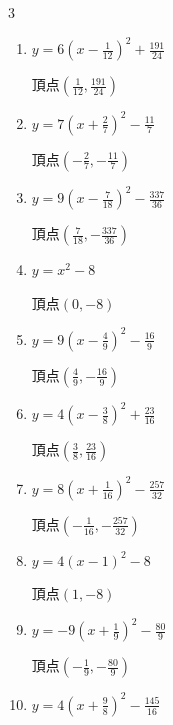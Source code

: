 \begin{multicols}{3}
\begin{enumerate}
        $\displaystyle 頂点\left( -\frac{3}{8} , \frac{7}{16} \right)$

  \item $\displaystyle y=6\left( x-\frac{1}{12}\right)^{2}+\frac{191}{24}$

        $\displaystyle 頂点\left( \frac{1}{12} , \frac{191}{24} \right)$

  \item $\displaystyle y=7\left( x+\frac{2}{7}\right)^{2}-\frac{11}{7}$

        $\displaystyle 頂点\left( -\frac{2}{7} , -\frac{11}{7} \right)$

  \item $\displaystyle y=9\left( x-\frac{7}{18}\right)^{2}-\frac{337}{36}$

        $\displaystyle 頂点\left( \frac{7}{18} , -\frac{337}{36} \right)$

  \item $\displaystyle y=x^{2}-8$

        $\displaystyle 頂点\left( 0 , -8 \right)$

\columnbreak %

  \item $\displaystyle y=9\left( x-\frac{4}{9}\right)^{2}-\frac{16}{9}$

        $\displaystyle 頂点\left( \frac{4}{9} , -\frac{16}{9} \right)$

  \item $\displaystyle y=4\left( x-\frac{3}{8}\right)^{2}+\frac{23}{16}$

        $\displaystyle 頂点\left( \frac{3}{8} , \frac{23}{16} \right)$

  \item $\displaystyle y=8\left( x+\frac{1}{16}\right)^{2}-\frac{257}{32}$

        $\displaystyle 頂点\left( -\frac{1}{16} , -\frac{257}{32} \right)$

  \item $\displaystyle y=4\left( x-1\right)^{2}-8$

        $\displaystyle 頂点\left( 1 , -8 \right)$

  \item $\displaystyle y=-9\left( x+\frac{1}{9}\right)^{2}-\frac{80}{9}$

        $\displaystyle 頂点\left( -\frac{1}{9} , -\frac{80}{9} \right)$

  \item $\displaystyle y=4\left( x+\frac{9}{8}\right)^{2}-\frac{145}{16}$


\end{enumerate}
\end{multicols}
